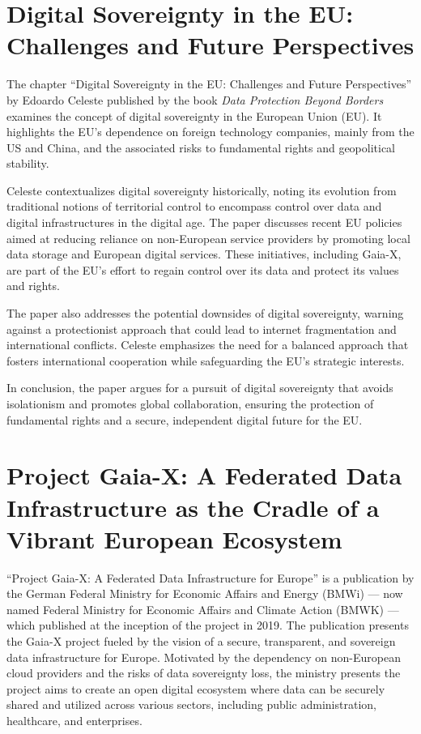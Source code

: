 \section{Digital Sovereignty in the EU: Challenges and Future Perspectives}\label{sec:digital-sovereignty-in-the-eu:-challenges-and-future-perspectives}

The chapter ``Digital Sovereignty in the EU: Challenges and Future Perspectives'' by Edoardo Celeste published by the book \textit{Data Protection Beyond Borders} examines the concept of digital sovereignty in the European Union (EU)\cite{dig_sovereignty_challenges}.
It highlights the EU's dependence on foreign technology companies, mainly from the US and China, and the associated risks to fundamental rights and geopolitical stability.

Celeste contextualizes digital sovereignty historically, noting its evolution from traditional notions of territorial control to encompass control over data and digital infrastructures in the digital age.
The paper discusses recent EU policies aimed at reducing reliance on non-European service providers by promoting local data storage and European digital services.
These initiatives, including Gaia-X, are part of the EU's effort to regain control over its data and protect its values and rights.

The paper also addresses the potential downsides of digital sovereignty, warning against a protectionist approach that could lead to internet fragmentation and international conflicts.
Celeste emphasizes the need for a balanced approach that fosters international cooperation while safeguarding the EU's strategic interests.

In conclusion, the paper argues for a pursuit of digital sovereignty that avoids isolationism and promotes global collaboration, ensuring the protection of fundamental rights and a secure, independent digital future for the EU.

\section{Project Gaia-X: A Federated Data Infrastructure as the Cradle of a Vibrant European Ecosystem}\label{sec:project-gaia-x:-a-federated-data-infrastructure-as-the-cradle-of-a-vibrant-european-ecosystem}

``Project Gaia-X: A Federated Data Infrastructure for Europe'' is a publication by the German Federal Ministry for Economic Affairs and Energy (BMWi) --- now named Federal Ministry for Economic Affairs and Climate Action (BMWK) --- which published at the inception of the project in 2019.
The publication presents the Gaia-X project fueled by the vision of a secure, transparent, and sovereign data infrastructure for Europe\cite{project_gaia_x}.
Motivated by the dependency on non-European cloud providers and the risks of data sovereignty loss, the ministry presents the project aims to create an open digital ecosystem where data can be securely shared and utilized across various sectors, including public administration, healthcare, and enterprises.

